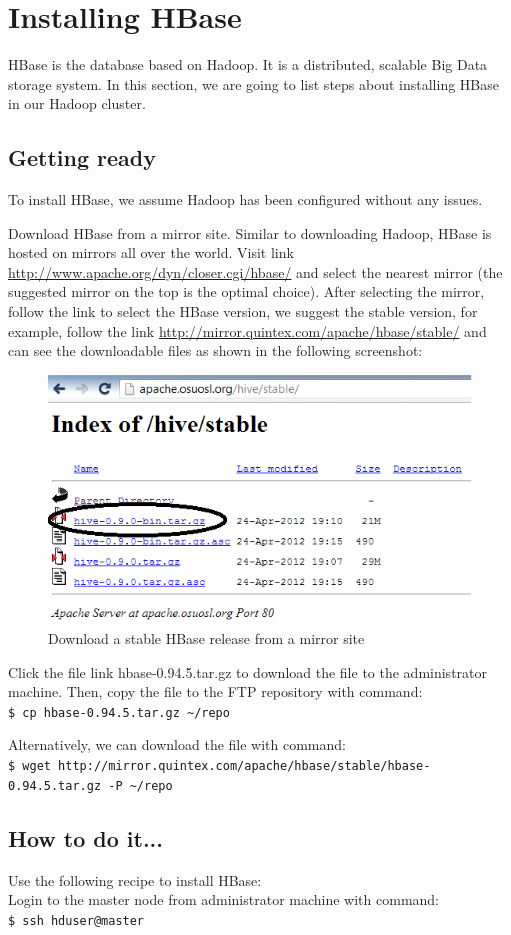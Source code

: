 \section{Installing HBase}
HBase is the database based on Hadoop. It is a distributed, scalable Big Data storage system. In this section, we are going to list steps about installing HBase in our Hadoop cluster.

\subsection*{Getting ready}
To install HBase, we assume Hadoop has been configured without any issues.

Download HBase from a mirror site. Similar to downloading Hadoop, HBase is hosted on mirrors all over the world. Visit link \url{http://www.apache.org/dyn/closer.cgi/hbase/} and select the nearest mirror (the suggested mirror on the top is the optimal choice).  After selecting the mirror, follow the link to select the HBase version, we suggest the stable version, for example, follow the link \url{http://mirror.quintex.com/apache/hbase/stable/} and can see the downloadable files as shown in the following screenshot:
\begin{figure}[h]
  \centering
  \includegraphics[width=.6\textwidth]{figs/5163os_03_08.png}
  \caption{Download a stable HBase release from a mirror site}\label{fig:hbase.download}
\end{figure} 

Click the file link hbase-0.94.5.tar.gz to download the file to the administrator machine. Then, copy the file to the FTP repository with command: \\
\verb|$ cp hbase-0.94.5.tar.gz ~/repo|

Alternatively, we can download the file with command: \\
\verb|$ wget http://mirror.quintex.com/apache/hbase/stable/hbase-0.94.5.tar.gz -P ~/repo|

\subsection*{How to do it...}
Use the following recipe to install HBase: \\
Login to the master node from administrator machine with command: \\
\verb|$ ssh hduser@master|

